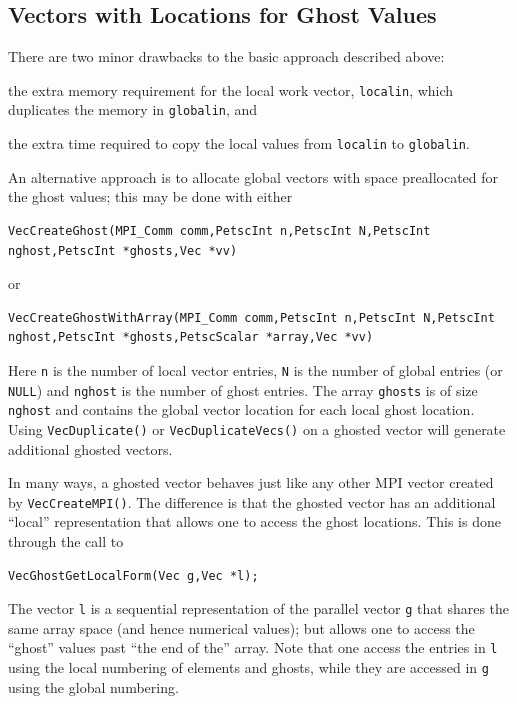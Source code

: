 \subsection{Vectors with Locations for Ghost Values}
There are two minor drawbacks to the basic approach described above:
\begin{tightitemize}
\item the extra memory requirement for the local work vector, \lstinline{localin}, which
      duplicates the memory in \lstinline{globalin}, and
\item the extra time required to copy the local values from \lstinline{localin} to
      \lstinline{globalin}.
\end{tightitemize}

An alternative approach is to allocate global vectors with space preallocated for
the ghost values; this may be done with either
\begin{lstlisting}
VecCreateGhost(MPI_Comm comm,PetscInt n,PetscInt N,PetscInt nghost,PetscInt *ghosts,Vec *vv)
\end{lstlisting}
or
\begin{lstlisting}
VecCreateGhostWithArray(MPI_Comm comm,PetscInt n,PetscInt N,PetscInt nghost,PetscInt *ghosts,PetscScalar *array,Vec *vv)
\end{lstlisting}
Here  \lstinline{n} is the
number of local vector entries, \lstinline{N} is the number of 
global entries (or \lstinline{NULL}) and \lstinline{nghost} is the number of
ghost entries. The array \lstinline{ghosts} is of size \lstinline{nghost} and contains the
global vector location for each local ghost location. Using \lstinline{VecDuplicate()}
or \lstinline{VecDuplicateVecs()} on a ghosted vector will generate additional ghosted vectors.

In many ways, a ghosted vector behaves just like any other MPI vector created
by \lstinline{VecCreateMPI()}. The difference is that the ghosted vector has an additional
``local'' representation that allows one to access the ghost locations. This is done
through the call to
\begin{lstlisting}
VecGhostGetLocalForm(Vec g,Vec *l);
\end{lstlisting}
The vector \lstinline{l} is a
sequential representation of the parallel vector \lstinline{g}
that shares the same array space (and hence numerical values); but allows one to
access the ``ghost'' values past ``the end of the'' array. Note that one access the
entries in \lstinline{l} using the local numbering of elements and ghosts, while they
are accessed in \lstinline{g} using the global numbering.

